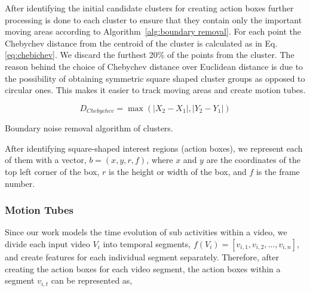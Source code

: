 After identifying the initial candidate clusters for creating action boxes further processing is done to each cluster to ensure that they contain only the important moving areas according to Algorithm~\ref{alg:boundary removal}. For each point the Chebychev distance from the centroid of the cluster is calculated as in
Eq. \ref{eq:chebichev}. We discard the furthest 20\% of the points from the cluster. The reason behind the choice of Chebychev distance over Euclidean distance is due to the possibility of obtaining symmetric square shaped cluster groups as opposed to circular ones. This makes it easier to track moving areas and create motion tubes.

\begin{equation}\label{eq:chebichev}
 D_{Chebychev} = \max(|X_{2} - X_{1}|,|Y_{2}-Y_{1}|)
\end{equation}

\begin{algorithm*}
   \caption{Boundary noise removal algorithm of clusters.}
   \label{alg:boundary removal}
    \begin{algorithmic}[1]
	  \EndIf
	
	\EndWhile
     \EndFunction


\end{algorithmic}
\end{algorithm*}

After identifying square-shaped interest regions (action boxes), we represent each of them with a vector, $b = (x,y,r,f)$, where $x$ and $y$ are the coordinates
of the top left corner of the box, $r$ is the height or width of the box, and $f$ is the frame number.


\subsubsection{Motion Tubes}
Since our work models the time evolution of sub activities within a video, we divide each input video $V_{i}$ into temporal segments, $f(V_{i}) = [v_{i,1},
v_{i,2}, \dots, v_{i,n}]$,
and create features for each individual segment separately. Therefore, after creating the action boxes for each video segment,
the action boxes within a segment $v_{i,t}$ can be represented as,

